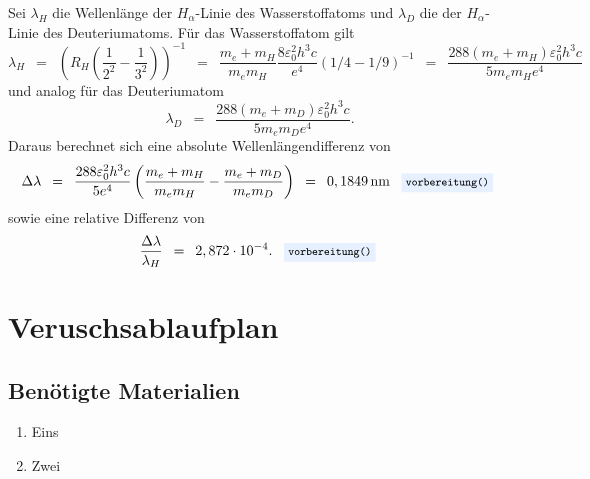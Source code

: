 \documentclass{article}
\newcommand{\widespace}{\enspace}
\newcommand{\wideeq}{\widespace = \widespace}
\newcommand{\result}[2]{
    #1 \, \text{#2}
}
\newcommand{\coderef}[1]{
    \text{
        \enspace
        \footnotesize
        \colorbox{codebg}{\texttt{#1()}}
    }
}
\begin{document}
Sei $\lambda_H$ die Wellenlänge der $H_\alpha$-Linie des Wasserstoffatoms
und $\lambda_D$ die der $H_\alpha$-Linie des Deuteriumatoms.
Für das Wasserstoffatom gilt
\[
    \lambda_H \wideeq \left(
        R_H \left( \frac{1}{2^2} - \frac{1}{3^2} \right)
    \right)^{-1}
    \wideeq \frac{m_e + m_H}{m_e m_H} \frac{8 \varepsilon_0^2 h^3 c}{e^4}
    \left( 1/4 - 1/9 \right)^{-1}
    \wideeq \frac{288 (m_e + m_H) \varepsilon_0^2 h^3 c}{5 m_e m_H e^4}
\]
und analog für das Deuteriumatom
\[
    \lambda_D \wideeq \frac{288 (m_e + m_D) \varepsilon_0^2 h^3 c}{5 m_e m_D e^4}.
\]
Daraus berechnet sich eine absolute Wellenlängendifferenz von
\[
    \Delta \lambda
    \wideeq \frac{288 \varepsilon_0^2 h^3 c}{5 e^4}
    \left(
        \frac{m_e + m_H}{m_e m_H} - \frac{m_e + m_D}{m_e m_D}
    \right)
    \wideeq \result{0,1849}{nm} \coderef{vorbereitung}
\]
sowie eine relative Differenz von
\[
    \frac{\Delta \lambda}{\lambda_H} \wideeq 2,872 \cdot 10^{-4}.
    \coderef{vorbereitung}
\]

\newpage

\section{Veruschsablaufplan}

\subsection{Benötigte Materialien}
    \begin{enumerate}[label=\arabic*.]
        \item Eins
        \item Zwei
    \end{enumerate}

\newpage
\end{document}
